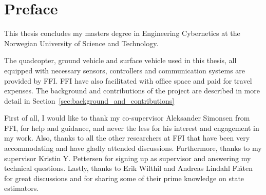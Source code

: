 \chapter{Preface} %
\label{cha:preface}

This thesis concludes my masters degree in Engineering Cybernetics at the Norwegian University of Science and Technology.

The quadcopter, ground vehicle and surface vehicle used in this thesis, all equipped with necessary sensors, controllers and communication systems are provided by \gls{FFI}. \gls{FFI} have also facilitated with office space and paid for travel expenses. The background and contributions of the project are described in more detail in Section~\ref{sec:background_and_contributions} 

First of all, I would like to thank my co-supervisor Aleksander Simonsen from \gls{FFI}, for help and guidance, and never the less for his interest and engagement in my work. Also, thanks to all the other researchers at \gls{FFI} that have been very accommodating and have gladly attended discussions. Furthermore, thanks to my supervisor Kristin Y. Pettersen for signing up as supervisor and answering my technical questions. Lastly, thanks to Erik Wilthil and Andreas Lindahl Flåten for great discussions and for sharing some of their prime knowledge on state estimators.

\glsresetall

\afterpage{\null\newpage}
